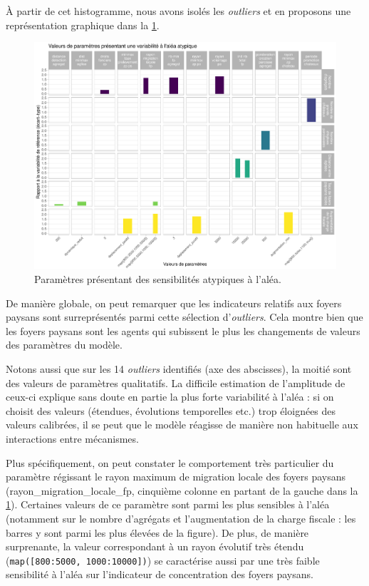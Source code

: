 À partir de cet histogramme, nous avons isolés les \textit{outliers} et en proposons une représentation graphique dans la \cref{fig:sensib-alea}.
\begin{figure}[H]
	\centering
	\includegraphics[width=\linewidth]{img/sensibilite_alea_outliers.pdf}
	\caption{Paramètres présentant des sensibilités atypiques à l'aléa.}
	\label{fig:sensib-alea}
\end{figure}

De manière globale, on peut remarquer que les indicateurs relatifs aux foyers paysans sont surreprésentés parmi cette sélection d'\textit{outliers}.
Cela montre bien que les foyers paysans sont les agents qui subissent le plus les changements de valeurs des paramètres du modèle.

Notons aussi que sur les 14 \textit{outliers} identifiés (axe des abscisses), la moitié sont des valeurs de paramètres qualitatifs.
La difficile estimation de l'amplitude de ceux-ci explique sans doute en partie la plus forte variabilité à l'aléa : si on choisit des valeurs (étendues, évolutions temporelles etc.) trop éloignées des valeurs calibrées, il se peut que le modèle réagisse de manière non habituelle aux interactions entre mécanismes.

Plus spécifiquement, on peut constater le comportement très particulier du paramètre régissant le rayon maximum de migration locale des foyers paysans (\textsf{rayon\_migration\_locale\_fp}, cinquième colonne en partant de la gauche dans la \cref{fig:sensib-alea}).
Certaines valeurs de ce paramètre sont parmi les plus sensibles à l'aléa (notamment sur le nombre d'agrégats et l'augmentation de la charge fiscale : les barres y sont parmi les plus élevées de la figure).
De plus, de manière surprenante, la valeur correspondant à un rayon évolutif très étendu (\texttt{map([800:5000, 1000:10000])}) se caractérise aussi par une très faible sensibilité à l'aléa sur l'indicateur de concentration des foyers paysans.

